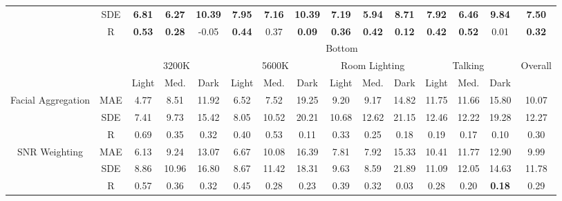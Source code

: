 \begin{table}[]
\begin{center}
{\begin{tabular}{c|c|ccccccccccccc}
 & SDE & \textbf{6.81} & \textbf{6.27} & \multicolumn{1}{c|}{\textbf{10.39}} & \textbf{7.95} & \textbf{7.16} & \multicolumn{1}{c|}{\textbf{10.39}} & \textbf{7.19} & \textbf{5.94} & \multicolumn{1}{c|}{\textbf{8.71}} & \textbf{7.92} & \textbf{6.46} & \multicolumn{1}{c|}{\textbf{9.84}} & \textbf{7.50} \\
 & R & \textbf{0.53} & \textbf{0.28} & \multicolumn{1}{c|}{-0.05} & \textbf{0.44} & 0.37 & \multicolumn{1}{c|}{\textbf{0.09}} & \textbf{0.36} & \textbf{0.42} & \multicolumn{1}{c|}{\textbf{0.12}} & \textbf{0.42} & \textbf{0.52} & \multicolumn{1}{c|}{0.01} & \textbf{0.32} \\ \hline
 \hline
 & \multicolumn{1}{l|}{} & \multicolumn{13}{c}{Bottom} \\ \cline{3-15} 
 & \multicolumn{1}{l|}{} & \multicolumn{3}{c|}{3200K} & \multicolumn{3}{c|}{5600K} & \multicolumn{3}{c|}{Room Lighting} & \multicolumn{3}{c|}{Talking} & \multicolumn{1}{l}{\multirow{2}{*}{Overall}} \\ \cline{3-14}
 & \multicolumn{1}{l|}{} & Light & Med. & \multicolumn{1}{c|}{Dark} & Light & Med. & \multicolumn{1}{c|}{Dark} & Light & Med. & \multicolumn{1}{c|}{Dark} & Light & Med. & \multicolumn{1}{c|}{Dark} & \multicolumn{1}{l}{} \\ \hline
\multirow{3}{3.5cm}{Facial Aggregation} & MAE & 4.77 & 8.51 & \multicolumn{1}{c|}{11.92} & 6.52 & 7.52 & \multicolumn{1}{c|}{19.25} & 9.20 & 9.17 & \multicolumn{1}{c|}{14.82} & 11.75 & 11.66 & \multicolumn{1}{c|}{15.80} & 10.07 \\
 & SDE & 7.41 & 9.73 & \multicolumn{1}{c|}{15.42} & 8.05 & 10.52 & \multicolumn{1}{c|}{20.21} & 10.68 & 12.62 & \multicolumn{1}{c|}{21.15} & 12.46 & 12.22 & \multicolumn{1}{c|}{19.28} & 12.27 \\
 & R & 0.69 & 0.35 & \multicolumn{1}{c|}{0.32} & 0.40 & 0.53 & \multicolumn{1}{c|}{0.11} & 0.33 & 0.25 & \multicolumn{1}{c|}{0.18} & 0.19 & 0.17 & \multicolumn{1}{c|}{0.10} & 0.30 \\ \hline
\multirow{3}{3.5cm}{SNR Weighting} & MAE & 6.13 & 9.24 & \multicolumn{1}{c|}{13.07} & 6.67 & 10.08 & \multicolumn{1}{c|}{16.39} & 7.81 & 7.92 & \multicolumn{1}{c|}{15.33} & 10.41 & 11.77 & \multicolumn{1}{c|}{12.90} & 9.99 \\
 & SDE & 8.86 & 10.96 & \multicolumn{1}{c|}{16.80} & 8.67 & 11.42 & \multicolumn{1}{c|}{18.31} & 9.63 & 8.59 & \multicolumn{1}{c|}{21.89} & 11.09 & 12.05 & \multicolumn{1}{c|}{14.63} & 11.78 \\
 & R & 0.57 & 0.36 & \multicolumn{1}{c|}{0.32} & 0.45 & 0.28 & \multicolumn{1}{c|}{0.23} & 0.39 & 0.32 & \multicolumn{1}{c|}{0.03} & 0.28 & 0.20 & \multicolumn{1}{c|}{\textbf{0.18}} & 0.29 \\ \hline

\end{tabular}}
\end{center}
\end{table}
